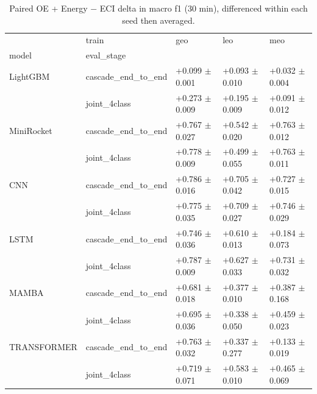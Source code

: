 \begin{table}
\centering
\caption{Paired OE + Energy $-$ ECI delta in macro f1 (30 min), differenced within each seed then averaged.}
\label{tab:featdelta_f1_phys}
\begin{tabular}{lllll}
\toprule
            & train &                 geo &                 leo &                 meo \\
model & eval_stage &                     &                     &                     \\
\midrule
LightGBM & cascade_end_to_end &  +0.099 $\pm$ 0.001 &  +0.093 $\pm$ 0.010 &  +0.032 $\pm$ 0.004 \\
            & joint_4class &  +0.273 $\pm$ 0.009 &  +0.195 $\pm$ 0.009 &  +0.091 $\pm$ 0.012 \\
MiniRocket & cascade_end_to_end &  +0.767 $\pm$ 0.027 &  +0.542 $\pm$ 0.020 &  +0.763 $\pm$ 0.012 \\
            & joint_4class &  +0.778 $\pm$ 0.009 &  +0.499 $\pm$ 0.055 &  +0.763 $\pm$ 0.011 \\
CNN & cascade_end_to_end &  +0.786 $\pm$ 0.016 &  +0.705 $\pm$ 0.042 &  +0.727 $\pm$ 0.015 \\
            & joint_4class &  +0.775 $\pm$ 0.035 &  +0.709 $\pm$ 0.027 &  +0.746 $\pm$ 0.029 \\
LSTM & cascade_end_to_end &  +0.746 $\pm$ 0.036 &  +0.610 $\pm$ 0.013 &  +0.184 $\pm$ 0.073 \\
            & joint_4class &  +0.787 $\pm$ 0.009 &  +0.627 $\pm$ 0.033 &  +0.731 $\pm$ 0.032 \\
MAMBA & cascade_end_to_end &  +0.681 $\pm$ 0.018 &  +0.377 $\pm$ 0.010 &  +0.387 $\pm$ 0.168 \\
            & joint_4class &  +0.695 $\pm$ 0.036 &  +0.338 $\pm$ 0.050 &  +0.459 $\pm$ 0.023 \\
TRANSFORMER & cascade_end_to_end &  +0.763 $\pm$ 0.032 &  +0.337 $\pm$ 0.277 &  +0.133 $\pm$ 0.019 \\
            & joint_4class &  +0.719 $\pm$ 0.071 &  +0.583 $\pm$ 0.010 &  +0.465 $\pm$ 0.069 \\
\bottomrule
\end{tabular}
\end{table}
